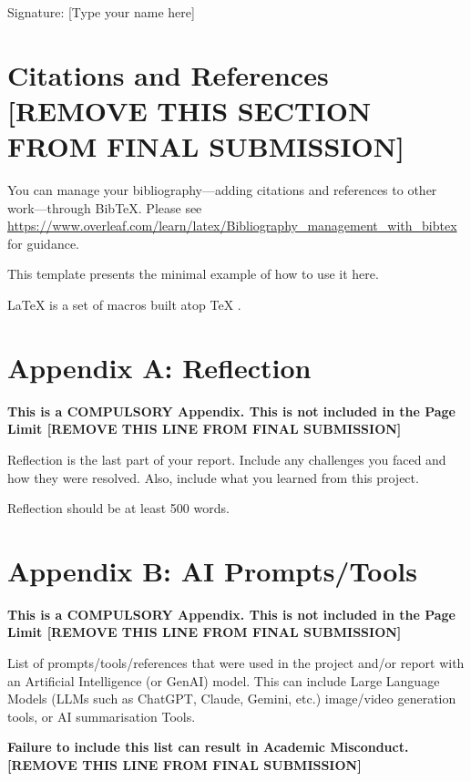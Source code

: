 \documentclass{article}
\begin{document}
Signature: [Type your name here]

\section*{Citations and References [REMOVE THIS SECTION FROM FINAL SUBMISSION]}
You can manage your bibliography---adding citations and references to other work---through BibTeX.
Please see \url{https://www.overleaf.com/learn/latex/Bibliography_management_with_bibtex} for guidance.

This template presents the minimal example of how to use it here.

\LaTeX{} \cite{latex2e} is a set of macros built atop \TeX{} \cite{texbook}.




\appendix

\section{Appendix A: Reflection}
\label{appx:reflection}

\textbf{This is a COMPULSORY Appendix. This is not included in the Page Limit [REMOVE THIS LINE FROM FINAL SUBMISSION]}

Reflection is the last part of your report. Include any challenges you faced and how they were resolved. Also, include what you learned from this project. 

Reflection should be at least 500 words. 

\section{Appendix B: AI Prompts/Tools}
\label{appx:ai_prompt}

\textbf{This is a COMPULSORY Appendix. This is not included in the Page Limit [REMOVE THIS LINE FROM FINAL SUBMISSION]}

List of prompts/tools/references that were used in the project and/or report with an Artificial Intelligence (or GenAI) model. This can include Large Language Models (LLMs such as ChatGPT, Claude, Gemini, etc.) image/video generation tools, or AI summarisation Tools.

\textbf{Failure to include this list can result in Academic Misconduct. [REMOVE THIS LINE FROM FINAL SUBMISSION]}
\end{document}
